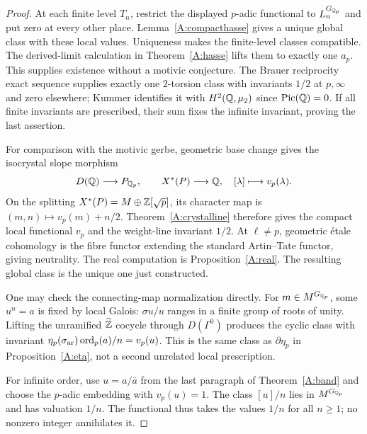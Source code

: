 \begin{proof}
At each finite level $T_n$, restrict the displayed $p$-adic
functional to $L_n^{G_{\mathbb Q_p}}$ and put zero at every other place.
Lemma~\ref{A:compacthasse} gives a unique global class with these
local values. Uniqueness makes the finite-level classes compatible.
The derived-limit calculation in Theorem~\ref{A:hasse} lifts them
to exactly one $a_p$. This supplies existence without a motivic
conjecture. The Brauer reciprocity exact sequence supplies exactly
one $2$-torsion class with invariants $1/2$ at $p,\infty$ and zero
elsewhere; Kummer identifies it with $H^2(\mathbb Q,\mu_2)$ since
$\operatorname{Pic}(\mathbb Q)=0$. If all finite invariants are prescribed, their
sum fixes the infinite invariant, proving the last assertion.

For comparison with the motivic gerbe, geometric base change gives
the isocrystal slope morphism
\[
 D(\mathbb Q)\longrightarrow P_{\mathbb Q_p},\qquad
 X^*(P)\longrightarrow\mathbb Q,\quad [\lambda]\longmapsto v_p(\lambda).
\]
On the splitting $X^*(P)=M\oplus\mathbb Z[\sqrt p]$, its character map
is $(m,n)\mapsto v_p(m)+n/2$. Theorem~\ref{A:crystalline}
therefore gives the compact local functional $v_p$ and the
weight-line invariant $1/2$. At $\ell\ne p$, geometric
\'etale cohomology is the fibre functor extending the standard
Artin--Tate functor, giving neutrality. The real computation is
Proposition~\ref{A:real}. The resulting global class is the unique
one just constructed.

One may check the connecting-map normalization directly. For
$m\in M^{G_{\mathbb Q_p}}$, some $u^n=a$ is fixed by local Galois:
$\sigma u/u$ ranges in a finite group of roots of unity. Lifting
the unramified $\widehat{\mathbb Z}$ cocycle through $D(\Gamma^0)$
produces the cyclic class with invariant
$\eta_p(\sigma_{\rm ar})\operatorname{ord}_p(a)/n=v_p(u)$.
This is the same class as $\partial\eta_p$ in
Proposition~\ref{A:eta}, not a second unrelated local prescription.

For infinite order, use $u=a/\bar a$ from the last paragraph of
Theorem~\ref{A:band} and choose the $p$-adic embedding with
$v_p(u)=1$. The class $[u]/n$ lies in $M^{G_{\mathbb Q_p}}$ and has
valuation $1/n$. The functional thus takes the values $1/n$
for all $n\geq1$; no nonzero integer annihilates it.
\end{proof}

